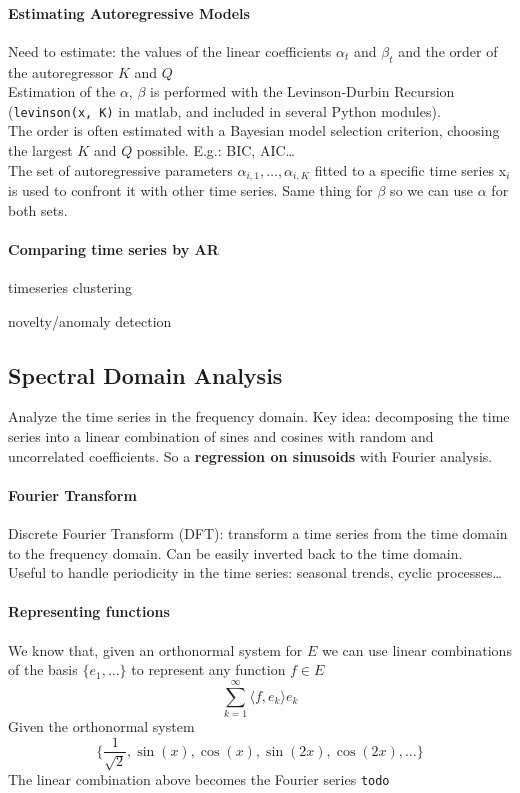 \documentclass[10pt]{report}
\begin{document}
\paragraph{Estimating Autoregressive Models} Need to estimate: the values of the linear coefficients $\alpha_t$ and $\beta_t$ and the order of the autoregressor $K$ and $Q$\\
Estimation of the $\alpha$, $\beta$ is performed with the Levinson-Durbin Recursion (\texttt{levinson(x, K)} in matlab, and included in several Python modules).\\
The order is often estimated with a Bayesian model selection criterion, choosing the largest $K$ and $Q$ possible. E.g.: BIC, AIC\ldots\\
The set of autoregressive parameters $\alpha_{i,1},\ldots,\alpha_{i,K}$ fitted to a specific time series x$_i$ is used to confront it with other time series. Same thing for $\beta$ so we can use $\alpha$ for both sets.
\paragraph{Comparing time series by AR}\begin{list}{}{}
	\item timeseries clustering %
	\item novelty/anomaly detection %
\end{list}
\subsection{Spectral Domain Analysis}
Analyze the time series in the frequency domain. Key idea: decomposing the time series into a linear combination of sines and cosines with random and uncorrelated coefficients. So a \textbf{regression on sinusoids} with Fourier analysis.
\paragraph{Fourier Transform} Discrete Fourier Transform (DFT): transform a time series from the time domain to the frequency domain. Can be easily inverted back to the time domain.\\
Useful to handle periodicity in the time series: seasonal trends, cyclic processes\ldots
\paragraph{Representing functions} We know that, given an orthonormal system for $E$ we can use linear combinations of the basis $\{e_1,\ldots\}$ to represent any function $f\in E$ $$\sum_{k=1}^\infty \langle f,e_k\rangle e_k$$
Given the orthonormal system $$\{\frac{1}{\sqrt{2}}, \sin(x),\cos(x),\sin(2x),\cos(2x),\ldots\}$$
The linear combination above becomes the Fourier series \texttt{todo} %
\end{document}
